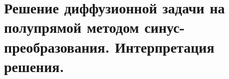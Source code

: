 \section{Решение диффузионной задачи на полупрямой методом
синус-преобразования. Интерпретация решения.}

\newpage
